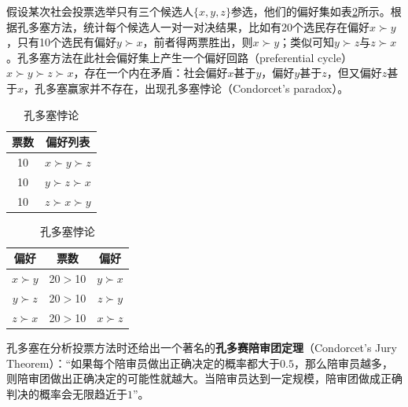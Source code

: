 \begin{example}
假设某次社会投票选举只有三个候选人$\{x,y,z\}$参选，他们的偏好集如表\ref{tbl:condorcetsparadox}所示。根据孔多塞方法，统计每个候选人一对一对决结果，比如有20个选民存在偏好$x\succ y$，只有10个选民有偏好$y\succ x$，前者得两票胜出，则$x\succ y$；类似可知$y\succ z$与$z\succ x$。孔多塞方法在此社会偏好集上产生一个偏好回路（preferential cycle）$x\succ y\succ z\succ x$，存在一个内在矛盾：社会偏好$x$甚于$y$，偏好$y$甚于$z$，但又偏好$z$甚于$x$，孔多塞赢家并不存在，出现孔多塞悖论（Condorcet's paradox）。
\begin{table}[ht]
    \centering
    \begin{minipage}[t]{0.3\linewidth}
    \centering
    \begin{tabular}{c|c}
      \hline
      票数 & 偏好列表\\
      \hline
      10 & $x\succ y \succ z$\\
      10 & $y\succ z \succ x$\\
      10 & $z\succ x \succ y$\\
      \hline
    \end{tabular}
    \end{minipage}
    \begin{minipage}[t]{0.3\linewidth}
    \centering
    \begin{tabular}{c|c|c}
      \hline
      偏好 & 票数 & 偏好\\
      \hline
      $x\succ y$ & 20$>$10 & $y\succ x$\\
      $y\succ z$ & 20$>$10 & $z\succ y$\\
      $z\succ x$ & 20$>$10 & $x\succ z$\\
      \hline
    \end{tabular}
    \end{minipage}    
    \caption{孔多塞悖论}
    \label{tbl:condorcetsparadox}
\end{table}
\end{example}

孔多塞在分析投票方法时还给出一个著名的\textbf{孔多赛陪审团定理}（Condorcet's Jury Theorem）：“如果每个陪审员做出正确决定的概率都大于$0.5$，那么陪审员越多，则陪审团做出正确决定的可能性就越大。当陪审员达到一定规模，陪审团做成正确判决的概率会无限趋近于$1$”。

